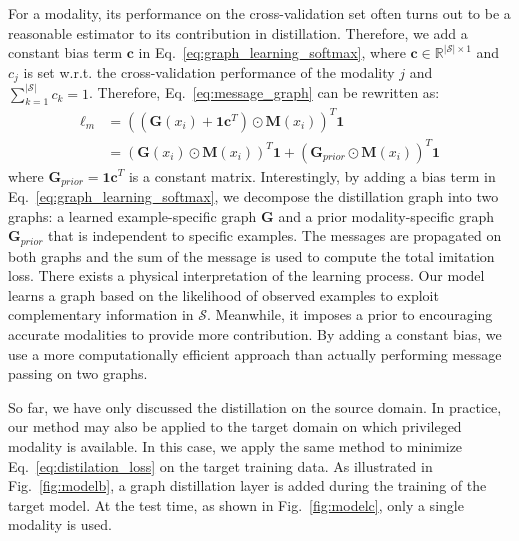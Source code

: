 For a modality, its performance on the cross-validation set often turns out to be a reasonable estimator to its contribution in distillation. Therefore, we add a constant bias term $\mathbf{c}$ in Eq.~\eqref{eq:graph_learning_softmax}, where $\mathbf{c} \in \mathbb{R}^{|\mathcal{S}| \times 1}$ and $c_j$ is set w.r.t. the cross-validation performance of the modality $j$ and $\sum_{k=1}^{|\mathcal{S}|} c_k = 1$. Therefore, Eq.~\eqref{eq:message_graph} can be rewritten as:
{\small
\begin{align}
\label{eq:message_graph_final}
\ell_m 
&= ((\mathbf{G}(x_i)+ \mathbf{1} \mathbf{c}^T)\odot\mathbf{M}(x_i))^T \mathbf{1} \\
&= (\mathbf{G}(x_i)\odot\mathbf{M}(x_i))^T\mathbf{1}+(\mathbf{G}_{prior}\odot\mathbf{M}(x_i))^T\mathbf{1}
\end{align}}where $\mathbf{G}_{prior} = \mathbf{1} \mathbf{c}^T$ is a constant matrix. Interestingly, by adding a bias term in Eq.~\eqref{eq:graph_learning_softmax}, we decompose the distillation graph into two graphs: a learned example-specific graph $\mathbf{G}$ and a prior modality-specific graph $\mathbf{G}_{prior}$ that is independent to specific examples. The messages are propagated on both graphs and the sum of the message is used to compute the total imitation loss. There exists a physical interpretation of the learning process. Our model learns a graph based on the likelihood of observed examples to exploit complementary information in $\mathcal{S}$. Meanwhile, it imposes a prior to encouraging accurate modalities to provide more contribution. By adding a constant bias, we use a more computationally efficient approach than actually performing message passing on two graphs. 

So far, we have only discussed the distillation on the source domain. In practice, our method may also be applied to the target domain on which privileged modality is available. In this case, we apply the same method to minimize Eq.~\eqref{eq:distilation_loss} on the target training data. As illustrated in Fig.~\ref{fig:modelb}, a graph distillation layer is added during the training of the target model. At the test time, as shown in Fig.~\ref{fig:modelc}, only a single modality is used.